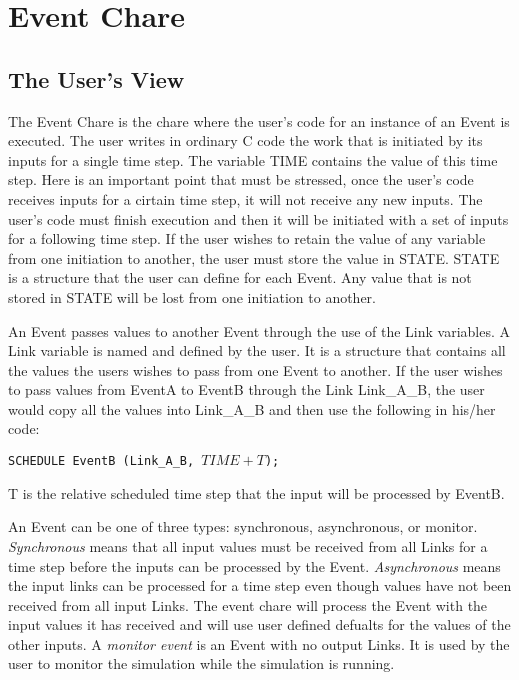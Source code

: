 
\section{Event Chare}
\label{evtchare}

\subsection{The User's View}

The Event Chare is the chare where the user's code for an instance of an
Event is executed.  The user writes in ordinary C code the work that is
initiated by its inputs for a single time step.  The variable TIME
contains the value of this time step.  Here is an important point that
must be stressed, once the user's code receives inputs for a cirtain
time step, it will not receive any new inputs.  The user's code must
finish execution and then it will be initiated with a set of inputs for
a following time step.  If the user wishes to retain the value of any
variable from one initiation to another, the user must store the value
in STATE.  STATE is a structure that the user can define for each Event.
Any value that is not stored in STATE will be lost from one initiation
to another.

An Event passes values to another Event through the use of the Link
variables.  A Link variable is named and defined by the user.  It is a
structure that contains all the values the users wishes to pass from one
Event to another.  If the user wishes to pass values from EventA to
EventB through the Link Link\_A\_B, the user would copy all the values
into Link\_A\_B and then use the following in his/her code:

{\tt SCHEDULE EventB (Link\_A\_B, $TIME + T$);}

T is the relative scheduled time step that the input will be processed
by EventB.  

An Event can be one of three types: synchronous, asynchronous, or
monitor.  {\em Synchronous} means that all input values must be
received from all Links for a time step before the inputs can be
processed by the Event.  {\em Asynchronous} means the input links can
be processed for a time step even though values have not been received
from all input Links.  The event chare will process the Event with the
input values it has received and will use user defined defualts for
the values of the other inputs.  A {\em monitor event} is an Event
with no output Links.  It is used by the user to monitor the
simulation while the simulation is running.

